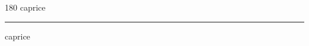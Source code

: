 
\begin{frame}
\begin{center}
\begin{turn}{180}
{\fontsize{2.5cm}{1em}\selectfont caprice}
\end{turn}
\vspace{1em}\par  
\hrule
\vspace{1em}\par  
{\fontsize{2.5cm}{1em}\selectfont caprice}
\end{center}
\end{frame}
